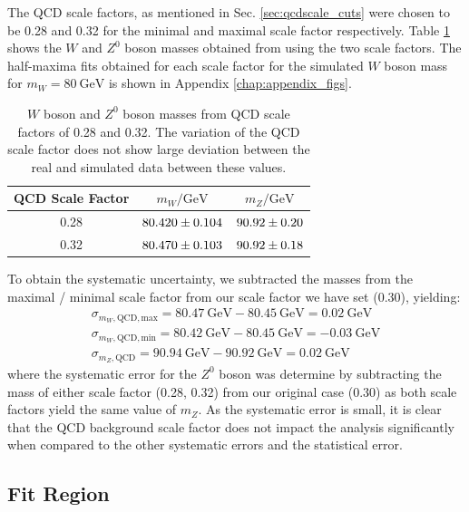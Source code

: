 \documentclass[a4paper]{report}
\numberwithin{equation}{section}
\begin{document}
The QCD scale factors, as mentioned in Sec. \ref{sec:qcdscale_cuts} were chosen to be 0.28 and 0.32 for the minimal and maximal scale 
factor respectively. Table \ref{tab:qcd_syserr} shows the $W$ and $Z^0$ boson masses obtained from using the two scale factors. The half-maxima fits obtained for each 
scale factor for the simulated $W$ boson mass for $m_W = \SI{80}{\giga\electronvolt}$ is shown in Appendix \ref{chap:appendix_figs}. 

\begin{table}[htb!]
    \centering
    \begin{tabular}{|c|c|c|} \hline
    QCD Scale Factor &  $m_W / \si{\giga\electronvolt}$ & $m_Z / \si{\giga\electronvolt}$\\ \hline
    0.28 & $\num{80.42 \pm 0.104}$ & $\num{90.92 \pm 0.20}$ \\ 
    0.32 & $\num{80.47 \pm 0.103}$ & $\num{90.92 \pm 0.18}$ \\ \hline
    \end{tabular}
    \caption{$W$ boson and $Z^0$ boson masses from QCD scale factors of 0.28 and 0.32. The variation of the QCD scale factor 
    does not show large deviation between the real and simulated data between these values.}
    \label{tab:qcd_syserr}
\end{table}

To obtain the systematic uncertainty, we subtracted the masses from the maximal / minimal scale factor from our scale 
factor we have set (0.30), yielding:
\begin{align}
    \sigma_{m_W, \mathrm{QCD, max}} = \SI{80.47}{\giga\electronvolt} - \SI{80.45}{\giga\electronvolt} = \SI{0.02}{\giga\electronvolt} \\
    \sigma_{m_W, \mathrm{QCD, min}} = \SI{80.42}{\giga\electronvolt} - \SI{80.45}{\giga\electronvolt} = -\SI{0.03}{\giga\electronvolt} \\
    \sigma_{m_Z, \mathrm{QCD}} = \SI{90.94}{\giga\electronvolt} - \SI{90.92}{\giga\electronvolt} = \SI{0.02}{\giga\electronvolt}
\end{align}
where the systematic error for the $Z^0$ boson was determine by subtracting the mass of either scale factor (0.28, 0.32) from our original 
case (0.30) as both scale factors yield the same value of $m_Z$.
As the systematic error is small, it is clear that the QCD background scale factor does not impact the analysis significantly when compared to the other systematic
  errors and the statistical error. 

\subsection{Fit Region}
\end{document}
